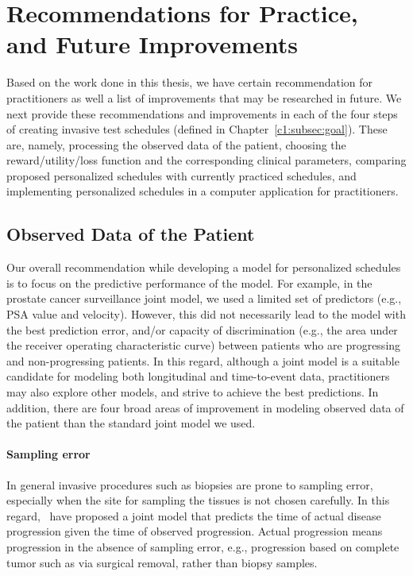 \section{Recommendations for Practice, and Future Improvements}
\label{c7:sec:future_research}
Based on the work done in this thesis, we have certain recommendation for practitioners as well a list of improvements that may be researched in future. We next provide these recommendations and improvements in each of the four steps of creating invasive test schedules (defined in Chapter~\ref{c1:subsec:goal}). These are, namely, processing the observed data of the patient, choosing the reward/utility/loss function and the corresponding clinical parameters, comparing proposed personalized schedules with currently practiced schedules, and implementing personalized schedules in a computer application for practitioners.

\subsection{Observed Data of the Patient}
Our overall recommendation while developing a model for personalized schedules is to focus on the predictive performance of the model. For example, in the prostate cancer surveillance joint model, we used a limited set of predictors (e.g., PSA value and velocity). However, this did not necessarily lead to the model with the best prediction error, and/or capacity of discrimination (e.g., the area under the receiver operating characteristic curve) between patients who are progressing and non-progressing patients. In this regard, although a joint model is a suitable candidate for modeling both longitudinal and time-to-event data, practitioners may also explore other models, and strive to achieve the best predictions. In addition, there are four broad areas of improvement in modeling observed data of the patient than the standard joint model we used.

\paragraph{Sampling error} In general invasive procedures such as biopsies are prone to sampling error, especially when the site for sampling the tissues is not chosen carefully. In this regard,~\citet{coley2017} have proposed a joint model that predicts the time of actual disease progression given the time of observed progression. Actual progression means progression in the absence of sampling error, e.g., progression based on complete tumor such as via surgical removal, rather than biopsy samples.


